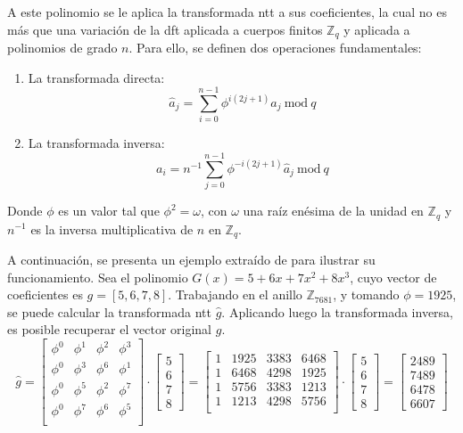 A este polinomio se le aplica la transformada \gls{ntt} a sus coeficientes, la cual no es más que una variación de la \gls{dft} aplicada a cuerpos finitos \(\mathbb{Z}_q\) y aplicada a polinomios de grado \(n\). Para ello, se definen dos operaciones fundamentales:
\begin{enumerate}
	\item La transformada directa:
	\begin{equation}
		\hat{a}_j=\sum_{i=0}^{n-1} \phi^{i\left(2j+1\right)} a_j \ \text{mod} \ q
	\end{equation}
	\item  La transformada inversa:
	\begin{equation}
		a_i=n^{-1} \sum_{j=0}^{n-1} \phi^{-i\left(2j+1\right)} \hat{a}_j \ \text{mod} \ q
	\end{equation}
\end{enumerate}

Donde $\phi$ es un valor tal que $\phi^2=\omega$, con $\omega$ una raíz enésima de la unidad en \(\mathbb{Z}_q\) y \(n^{-1}\) es la inversa multiplicativa de \(n\) en \(\mathbb{Z}_q\).
\newline

A continuación, se presenta un ejemplo extraído de \cite{cryptoeprint:2024/585} para ilustrar su funcionamiento. Sea el polinomio \(G(x)=5+6x+7x^2+8x^3\), cuyo vector de coeficientes es \(g=[5,6,7,8]\). Trabajando en el anillo \(\mathbb{Z}_{7681}\), y tomando $\phi=1925$, se puede calcular la transformada \gls{ntt} \(\hat{g}\). Aplicando luego la transformada inversa, es posible recuperar el vector original \(g\).
\begin{equation}
	\hat{g}=\begin{bmatrix}
		\phi^0 & \phi^1 & \phi^2 & \phi^3\\
		\phi^0 & \phi^3 & \phi^6 & \phi^1\\
		\phi^0 & \phi^5 & \phi^2 & \phi^7\\
		\phi^0 & \phi^7 & \phi^6 & \phi^5\\
	\end{bmatrix} \cdot \begin{bmatrix}
	5\\
	6\\
	7\\
	8
	\end{bmatrix}=\begin{bmatrix}
	1 & 1925 & 3383 & 6468\\
	1 & 6468 & 4298 & 1925\\
	1 & 5756 & 3383 & 1213\\
	1 & 1213 & 4298 & 5756\\
	\end{bmatrix} \cdot \begin{bmatrix}
	5\\
	6\\
	7\\
	8 \end{bmatrix}= \begin{bmatrix}
	2489\\
	7489\\
	6478\\
	6607 \end{bmatrix}
\end{equation}

